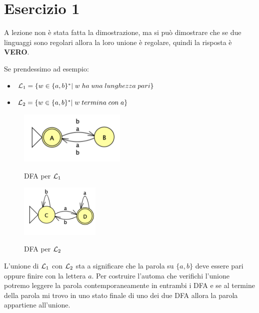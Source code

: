 \documentclass[11pt]{article}
\begin{document}
\section*{Esercizio 1}
A lezione non è stata fatta la dimostrazione, ma si può dimostrare
che se due linguaggi sono regolari allora la loro unione è regolare, quindi la risposta è \textbf{VERO}.
\begin{tcolorbox}[colframe=orange!70!black, colback=orange!10!white, title=\textbf{\textit{Nota inutile ai fini dell'esercizio:}}]
Se prendessimo ad esempio:
\begin{itemize}
  \item ${\cal L}_1 = \{w \in \{a,b\}^*|\;w\;ha\;una\;lunghezza\;pari\}$  
  \item ${\cal L}_2 = \{w \in \{a,b\}^*|\;w\;termina\;con\;a\}$  
\end{itemize}
\begin{multicols}{2}
  \begin{figure}[H]
  \centering
    \includegraphics[height=2.5cm]{img/01Pari.png}
    \label{fig:01-DFA-pari}
    \caption*{DFA per ${\cal L}_1$}
  \end{figure}
  \begin{figure}[H]
  \centering
    \includegraphics[height=2.5cm]{img/01FinisceConA.png}
    \label{fig:01-DFA-finisce-con-a}
    \caption*{DFA per ${\cal L}_2$}
  \end{figure}
\end{multicols}
L'unione di  ${\cal L}_1$ con  ${\cal L}_2$ sta a significare che la 
parola su $\{a, b\}$ deve essere pari oppure finire con la lettera $a$.
Per costruire l'automa che verifichi l'unione potremo leggere la parola
contemporaneamente in entrambi i DFA e se al termine della parola mi 
trovo in uno stato finale di uno dei due DFA allora la parola appartiene
all'unione.


\end{tcolorbox}
\end{document}

